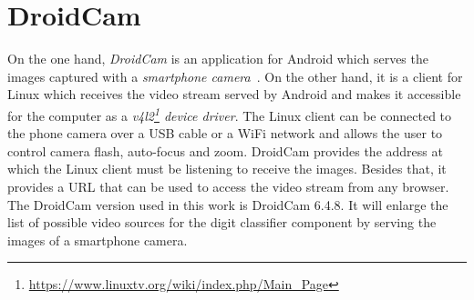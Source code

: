 \section{DroidCam}\label{sec:droidcam}
On the one hand, \emph{DroidCam} is an application for Android which serves the images captured with a \emph{smartphone camera}~\cite{droidcam}. On the other hand, it is a client for Linux which receives the video stream served by Android and makes it accessible for the computer as a \emph{v4l2\footnote{\url{https://www.linuxtv.org/wiki/index.php/Main_Page}} device driver}. The Linux client can be connected to the phone camera over a USB cable or a WiFi network and allows the user to control camera flash, auto-focus and zoom. DroidCam provides the address at which the Linux client must be listening to receive the images. Besides that, it provides a URL that can be used to access the video stream from any browser. The DroidCam version used in this work is DroidCam 6.4.8. It will enlarge the list of possible video sources for the digit classifier component by serving the images of a smartphone camera.

